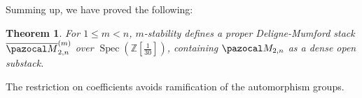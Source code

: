 \documentclass{compositio}
\newcommand{\oM}{\overline{\pazocal M}}
\theoremstyle{plain}
\newtheorem{thm}{Theorem}[section]
\theoremstyle{definition}
\theoremstyle{remark}
\begin{document}
Summing up, we have proved the following:
\begin{thm}
 For $1\leq m <n$, $m$-stability defines a proper Deligne-Mumford stack $\oM_{2,n}^{(m)}$ over $\operatorname{Spec}(\mathbb Z[\frac{1}{30}])$, containing $\pazocal M_{2,n}$ as a dense open substack.
\end{thm}
 The restriction on coefficients avoids ramification of the automorphism groups.


 
 

\end{document}
